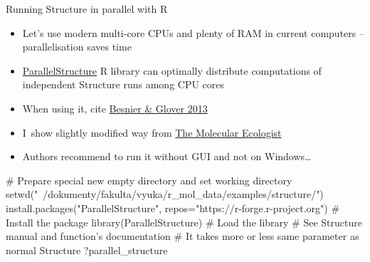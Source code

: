 \documentclass[compress, ucs, xelatex, 11pt, xcolor=svgnames,
  hyperref={
    bookmarks=true,
    unicode=true,
    colorlinks=true,
    pdftitle={Molecular data in R},
    plainpages=false,
    pdfauthor={Vojtech Zeisek},
    pdfsubject={Course about phylogeny and evolution in R},
    pdfcreator={XeLaTeX},
    pdfkeywords={R, evolution, phylogeny, molecular data},
    linkcolor=Tomato,
    anchorcolor=SaddleBrown,
    citecolor=Goldenrod,
    filecolor=DarkMagenta,
    menucolor=Sienna,
    urlcolor=DarkTurquoise,
    pdftex},
  url={hyphens, lowtilde} %
  ]{beamer}
\begin{document}
\begin{frame}[fragile]{Running Structure in parallel with R}
  \begin{itemize}
    \item Let's use modern multi-core CPUs and plenty of RAM in current computers -- parallelisation saves time
    \item \href{https://r-forge.r-project.org/R/?group_id=1636}{ParallelStructure} R library can optimally distribute computations of independent Structure runs among CPU cores
    \item When using it, cite \href{http://www.plosone.org/article/info\%3Adoi\%2F10.1371\%2Fjournal.pone.0070651}{Besnier \& Glover 2013}
    \item I~show slightly modified way from \href{http://www.molecularecologist.com/2013/09/using-r-to-run-parallel-analysis-of-population-genetic-data-in-structure-parallelstructure/}{The Molecular Ecologist}
    \item Authors recommend to run it without GUI and not on Windows\ldots
  \end{itemize}
  \begin{spluscode}
    # Prepare special new empty directory and set working directory
    setwd("~/dokumenty/fakulta/vyuka/r_mol_data/examples/structure/")
    install.packages("ParallelStructure",
      repos="https://r-forge.r-project.org") # Install the package
    library(ParallelStructure) # Load the library
    # See Structure manual and function's documentation
    # It takes more or less same parameter as normal Structure
    ?parallel_structure
  \end{spluscode}
\end{frame}
\end{document}
